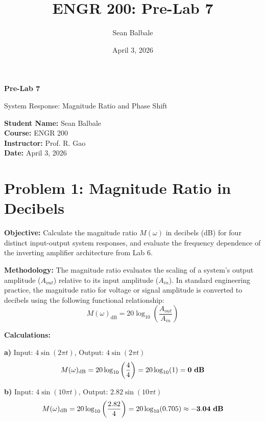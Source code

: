 \documentclass[11pt]{article}
\title{ENGR 200: Pre-Lab 7}
\author{Sean Balbale}
\date{April 3, 2026}
\begin{document}
\begin{titlepage}
  \begin{center}
    \vspace*{1in}

    \Huge
    \textbf{Pre-Lab 7}

    \LARGE
    System Response: Magnitude Ratio and Phase Shift

    \vspace{3in}

    \textbf{Student Name:} Sean Balbale
    \\ \textbf{Course:} ENGR 200
    \\ \textbf{Instructor:} Prof. R. Gao
    \\ \textbf{Date:} April 3, 2026

    \vfill

  \end{center}
\end{titlepage}

\newpage

\section*{Problem 1: Magnitude Ratio in Decibels}

\textbf{Objective:} Calculate the magnitude ratio $M(\omega)$ in decibels (dB) for four distinct input-output system responses, and evaluate the frequency dependence of the inverting amplifier architecture from Lab 6.

\textbf{Methodology:}
The magnitude ratio evaluates the scaling of a system's output amplitude ($A_{out}$) relative to its input amplitude ($A_{in}$). In standard engineering practice, the magnitude ratio for voltage or signal amplitude is converted to decibels using the following functional relationship:
\[ M(\omega)_{\text{dB}} = 20 \log_{10} \left( \frac{A_{out}}{A_{in}} \right) \]

\textbf{Calculations:}

\textbf{a)} Input: $4\sin(2\pi t)$, Output: $4\sin(2\pi t)$
\[ M(\omega)_{\text{dB}} = 20 \log_{10} \left( \frac{4}{4} \right) = 20 \log_{10}(1) = \mathbf{0} \text{ \textbf{dB}} \]

\textbf{b)} Input: $4\sin(10\pi t)$, Output: $2.82\sin(10\pi t)$
\[ M(\omega)_{\text{dB}} = 20 \log_{10} \left( \frac{2.82}{4} \right) = 20 \log_{10}(0.705) \approx \mathbf{-3.04} \text{ \textbf{dB}} \]
\end{document}

